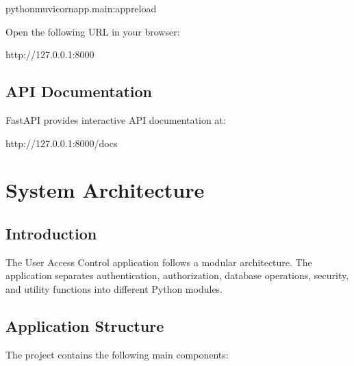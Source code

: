 \documentclass[letterpaper,10pt,english]{sphinxmanual}
\begin{document}
\begin{sphinxVerbatim}[commandchars=\\\{\}]
python\PYGZhy{}muvicornapp.main:app\PYGZhy{}\PYGZhy{}reload
\end{sphinxVerbatim}

\sphinxAtStartPar
Open the following URL in your browser:

\begin{sphinxVerbatim}[commandchars=\\\{\}]
http://127.0.0.1:8000
\end{sphinxVerbatim}


\subsection{API Documentation}
\label{\detokenize{installation:api-documentation}}
\sphinxAtStartPar
FastAPI provides interactive API documentation at:

\begin{sphinxVerbatim}[commandchars=\\\{\}]
http://127.0.0.1:8000/docs
\end{sphinxVerbatim}

\sphinxstepscope


\section{System Architecture}
\label{\detokenize{architecture:system-architecture}}\label{\detokenize{architecture::doc}}

\subsection{Introduction}
\label{\detokenize{architecture:introduction}}
\sphinxAtStartPar
The User Access Control application follows a modular architecture.
The application separates authentication, authorization, database operations,
security, and utility functions into different Python modules.


\subsection{Application Structure}
\label{\detokenize{architecture:application-structure}}
\sphinxAtStartPar
The project contains the following main components:
\end{document}
